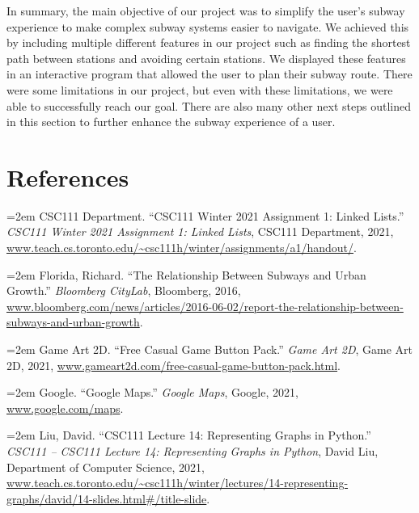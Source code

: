 \documentclass[fontsize=11pt]{article}
\begin{document}
In summary, the main objective of our project was to simplify the user’s subway experience to make complex subway systems easier to navigate. We achieved this by including multiple different features in our project such as finding the shortest path between stations and avoiding certain stations. We displayed these features in an interactive program that allowed the user to plan their subway route. There were some limitations in our project, but even with these limitations, we were able to successfully reach our goal. There are also many other next steps outlined in this section to further enhance the subway experience of a user.

\newpage

\section*{References}


\hangindent=2em  
\noindent  
CSC111 Department. ``CSC111 Winter 2021 Assignment 1: Linked Lists.” \textit{CSC111 Winter 2021 Assignment 1: Linked Lists}, CSC111 Department, 2021, \url{www.teach.cs.toronto.edu/~csc111h/winter/assignments/a1/handout/}.

\bigskip 
 
\hangindent=2em  
\noindent
Florida, Richard. ``The Relationship Between Subways and Urban Growth.” \textit{Bloomberg CityLab}, Bloomberg, 2016, \url{www.bloomberg.com/news/articles/2016-06-02/report-the-relationship-between-subways-and-urban-growth}.
 
\bigskip 
 
\hangindent=2em  
\noindent
Game Art 2D. ``Free Casual Game Button Pack.” \textit{Game Art 2D}, Game Art 2D, 2021, \url{www.gameart2d.com/free-casual-game-button-pack.html}. 

\bigskip 
 
\hangindent=2em  
\noindent  
Google. ``Google Maps.” \textit{Google Maps}, Google, 2021, \url{www.google.com/maps}. 

\bigskip 
 
\hangindent=2em  
\noindent  
Liu, David. ``CSC111 Lecture 14: Representing Graphs in Python.” \textit{CSC111 – CSC111 Lecture 14: Representing Graphs in Python}, David Liu, Department of Computer Science, 2021, \url{www.teach.cs.toronto.edu/~csc111h/winter/lectures/14-representing-graphs/david/14-slides.html#/title-slide}. 
\end{document}
